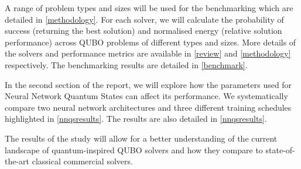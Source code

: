 

A range of problem types and sizes will be used for the benchmarking which are detailed in \autoref{methodology}. For each solver, we will calculate the probability of success (returning the best solution) and normalised energy (relative solution performance) across QUBO problems of different types and sizes. More details of the solvers and performance metrics are available in \autoref{review} and \autoref{methodology} respectively. The benchmarking results are detailed in \autoref{benchmark}.

In the second section of the report, we will explore how the parameters used for Neural Network Quantum States can affect its performance. We systematically compare two neural network architectures and three different training schedules highlighted in \autoref{nnqsresults}. The results are also detailed in \autoref{nnqsresults}.

The results of the study will allow for a better understanding of the current landscape of quantum-inspired QUBO solvers and how they compare to state-of-the-art classical commercial solvers.